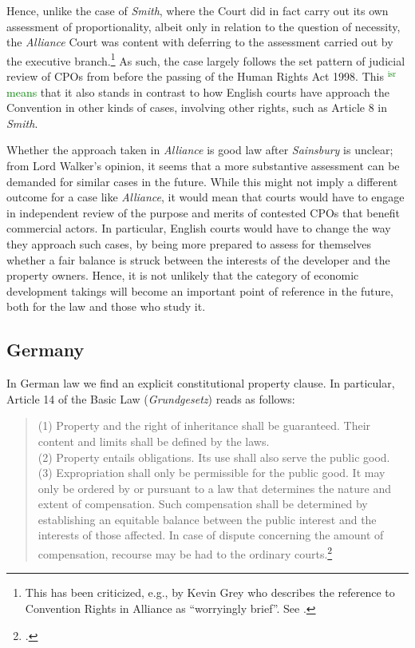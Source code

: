 \documentclass[12pt,a4paper]{book} %
\newcommand{\isr}[1]{\textcolor{green}{$^{\textrm{isr}}${#1}}}
\begin{document}
Hence, unlike the case of {\it Smith}, where the Court did in fact carry out its own assessment of proportionality, albeit only in relation to the question of necessity, the {\it Alliance} Court was content with deferring to the assessment carried out by the executive branch.\footnote{This has been criticized, e.g., by Kevin Grey who describes the reference to Convention Rights in Alliance as ``worryingly brief''. See \cite{gray11}.} As such, the case largely follows the set pattern of judicial review of CPOs from before the passing of the Human Rights Act 1998. This \isr{means} that it also stands in contrast to how English courts have approach the Convention in other kinds of cases, involving other rights, such as Article 8 in {\it Smith}. 

Whether the approach taken in {\it Alliance} is good law after {\it Sainsbury} is unclear; from Lord Walker's opinion, it seems that a more substantive assessment can be demanded for similar cases in the future. While this might not imply a different outcome for a case like {\it Alliance}, it would mean that courts would have to engage in independent review of the purpose and merits of contested CPOs that benefit commercial actors. In particular, English courts would have to change the way they approach such cases, by being more prepared to assess for themselves whether a fair balance is struck between the interests of the developer and the property owners. Hence, it is not unlikely that the category of economic development takings will become an important point of reference in the future, both for the law and those who study it.

\subsection{Germany}\label{sec:germany}

In German law we find an explicit constitutional property clause. In particular, Article 14 of the Basic Law ({\it Grundgesetz}) reads as follows:

\begin{quote}
(1) Property and the right of inheritance shall be guaranteed. Their content and limits shall be defined by the laws. \\
(2) Property entails obligations. Its use shall also serve the public good. \\
(3) Expropriation shall only be permissible for the public good. It may only be ordered by or pursuant to a law that determines the nature and extent of compensation. Such compensation shall be determined by establishing an equitable balance between the public interest and the interests of those affected. In case of dispute concerning the amount of compensation, recourse may be had to the ordinary courts.\footcite[14]{basic49}
\end{quote}
\end{document}
